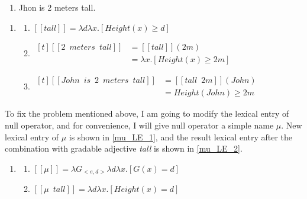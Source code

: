 \documentclass{ctexart}
\begin{document}
\begin{enumerate}[resume]
    \item \label{john_gao_2_mi} Jhon is 2 meters tall.
\end{enumerate}

\begin{enumerate}[resume]
    \item \label{john_gao_2_mi_LE}
    
    \begin{enumerate}[ref=(\arabic{enumi}\alph*)]
    \item \label{john_gao_2_mi_LE_a} 
    $[\![tall]\!] = \lambda d \lambda x.[Height(x) \geq d]$
    
    \item \label{john_gao_2_mi_LE_b} 
    $\begin{aligned}[t]
        [\![2 \enspace meters \enspace tall]\!] &= [\![tall]\!](2m) \\
        &= \lambda x.[Height(x) \geq 2m]
    \end{aligned}$
    
    \item \label{john_gao_2_mi_LE_c} 
    $\begin{aligned}[t]
        [\![John \enspace is \enspace 2 \enspace meters \enspace tall]\!] &= [\![tall \enspace 2m]\!](John) \\
        &= Height(John) \geq 2m
    \end{aligned}$
    
    \end{enumerate}
\end{enumerate}

To fix the problem mentioned above, I am going to modify the lexical entry of null operator, and for convenience, I will give null operator a simple name $\mu$. New lexical entry of $\mu$ is shown in \ref{mu_LE_1}, and the result lexical entry after the combination with gradable adjective \textit{tall} is shown in \ref{mu_LE_2}.

\begin{enumerate}[resume]
    \item \label{mu_LE}
    
    \begin{enumerate}[ref=(\arabic{enumi}\alph*)]
        \item \label{mu_LE_1}
        $[\![\mu]\!] =  \lambda G_{<e,d>}\lambda d \lambda x.[G(x) = d]$
        \item \label{mu_LE_2}
        $[\![\mu \enspace tall]\!] = \lambda d \lambda x.[Height(x) = d]$
    \end{enumerate}
\end{enumerate}
\end{document}
